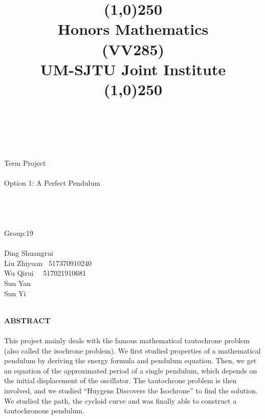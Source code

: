 \documentclass[12pt,a4paper]{article}
\title{ \line(1,0){250}
\\\sc\Large Honors Mathematics
\\\normalsize\sc(VV285)
\\UM-SJTU Joint Institute
\\\line(1,0){250}}
\begin{document}
 \maketitle
 \thispagestyle{empty}

 \begin{center}
~\\
~\\
~\\ 
 \LARGE\sc
 Term Project\\
 ~\\
  \LARGE Option 1: A Perfect Pendulum\\
~\\
 ~\\
 ~\\
 ~\\

\rm \Large 
Group:19\\
~\\
\large
Ding Shuangrui \\
Liu Zhiyuan  \qquad \quad \ 517370910240 \\
Wu Qirui \qquad  \qquad \ \  517021910681\\
Sun Yan  \qquad \qquad {} \\
Sun Yi  \qquad \qquad \quad {} \\
\end{center} 
\newpage
~\\
\Large \textbf{ABSTRACT}\\
\normalsize
~\\
\qquad This project mainly deals with the famous mathematical tautochrone problem (also called the isochrone problem). We first studied properties of a mathematical pendulum by deriving the energy formula and pendulum equation. Then, we get an equation of the approximated period of a single pendulum, which depends on the initial displacement of the oscillator. The tautochrone problem is then involved, and we studied “Huygens Discovers the Isochrone” to find the solution. We studied the path, the cycloid curve and was finally able to construct a tautochronous pendulum. \\
\newpage
\tableofcontents
\newpage
\end{document}
